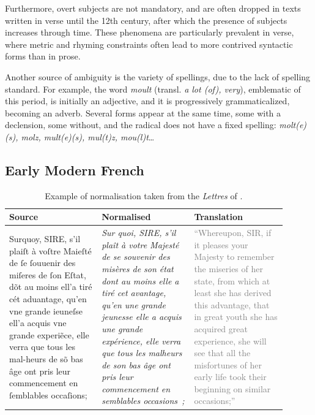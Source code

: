 Furthermore, overt subjects are not mandatory, and are often dropped in texts written in verse until the 12th century, after which the presence of subjects increases through time.
These phenomena are particularly prevalent in verse, where metric and rhyming constraints often lead to more contrived syntactic forms than in prose.

Another source of ambiguity is the variety of spellings, due to the lack of spelling standard. For example, the word \textit{moult} (transl. \textit{a lot (of), very}), emblematic of this period, is initially an adjective, and it is progressively grammaticalized, becoming an adverb. Several forms appear at the same time, some with a declension, some without, and the radical does not have a fixed spelling: \textit{molt(e)(s), molz, mult(e)(s), mul(t)z, mou(l)t}…

\subsection{Early Modern French}\label{def:early}

\begin{table}[!htp]
    \centering\small
    \begin{tabular}{@{}p{0.3\linewidth}p{0.3\linewidth}p{0.3\linewidth}@{}}
        \toprule
        Source                                                                                                                                                                                                                                                                                               & Normalised & Translation \\
        \midrule
        Surquoy, SIRE, s’il plaiſt à voſtre Maieſté de ſe ſouuenir des miſeres de ſon Eſtat, dõt au moins ell’a tiré cét aduantage, qu’en vne grande ieuneſse ell’a acquis vne grande experi\~ece, elle verra que tous les mal-heurs de sõ bas âge ont pris leur commencement en ſemblables occaſions;       &
        \emph{Sur quoi, SIRE, s’il plaît à votre Majesté de se souvenir des misères de son état dont au moins elle a tiré cet avantage, qu’en une grande jeunesse elle a acquis une grande expérience, elle verra que tous les malheurs de son bas âge ont pris leur commencement en semblables occasions~;} &
        \textcolor{gray}{``Whereupon, SIR, if it pleases your Majesty to remember the miseries of her state, from which at least she has derived this advantage, that in great youth she has acquired great experience, she will see that all the misfortunes of her early life took their beginning on similar occasions;''}           \\
        \bottomrule
    \end{tabular}
    \caption{\label{tab:norm_examples}Example of normalisation taken from the \emph{Lettres} of \protect{}.}
\end{table}

